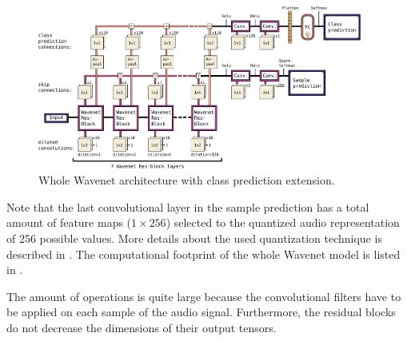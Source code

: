 \begin{figure}[!ht]
  \centering
    \includegraphics[width=0.95\textwidth]{./4_nn/figs/nn_arch_wavenet_all.pdf}
  \caption{Whole Wavenet architecture with class prediction extension.}
  \label{fig:nn_arch_wavenet_all}
\end{figure}
\FloatBarrier
\noindent
Note that the last convolutional layer in the sample prediction has a total amount of feature maps ($1 \times 256$) selected to the quantized audio representation of 256 possible values.
More details about the used quantization technique is described in \cite{Oord2016}.
The computational footprint of the whole Wavenet model is listed in .

The amount of operations is quite large because the convolutional filters have to be applied on each sample of the audio signal.
Furthermore, the residual blocks do not decrease the dimensions of their output tensors.